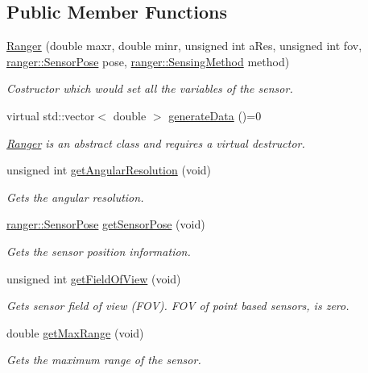 \subsection*{Public Member Functions}
\begin{DoxyCompactItemize}
\item 
\hyperlink{classRanger_ad87e3ddf656eae8f77c88297a313c8a1}{Ranger} (double maxr, double minr, unsigned int a\+Res, unsigned int fov, \hyperlink{structranger_1_1SensorPose}{ranger\+::\+Sensor\+Pose} pose, \hyperlink{namespaceranger_ab04465c229cc50595ffe40a891a3b135}{ranger\+::\+Sensing\+Method} method)
\begin{DoxyCompactList}\small\item\em Costructor which would set all the variables of the sensor. \end{DoxyCompactList}\item 
virtual std\+::vector$<$ double $>$ \hyperlink{classRanger_a1ac4a84f251b0793fc262643080f084a}{generate\+Data} ()=0
\begin{DoxyCompactList}\small\item\em \hyperlink{classRanger}{Ranger} is an abstract class and requires a virtual destructor. \end{DoxyCompactList}\item 
unsigned int \hyperlink{classRanger_a95b5013ae191d1e19b93fab002306718}{get\+Angular\+Resolution} (void)
\begin{DoxyCompactList}\small\item\em Gets the angular resolution. \end{DoxyCompactList}\item 
\hyperlink{structranger_1_1SensorPose}{ranger\+::\+Sensor\+Pose} \hyperlink{classRanger_aec1e730fbf4b46b01b08f6655152fc39}{get\+Sensor\+Pose} (void)
\begin{DoxyCompactList}\small\item\em Gets the sensor position information. \end{DoxyCompactList}\item 
unsigned int \hyperlink{classRanger_a4bca7dce56b7959257d90b1f30bf0271}{get\+Field\+Of\+View} (void)
\begin{DoxyCompactList}\small\item\em Gets sensor field of view (F\+OV). F\+OV of point based sensors, is zero. \end{DoxyCompactList}\item 
double \hyperlink{classRanger_aba5e81260e55089d9ff869051156a722}{get\+Max\+Range} (void)
\begin{DoxyCompactList}\small\item\em Gets the maximum range of the sensor. \end{DoxyCompactList}\item 

\end{DoxyCompactItemize}
